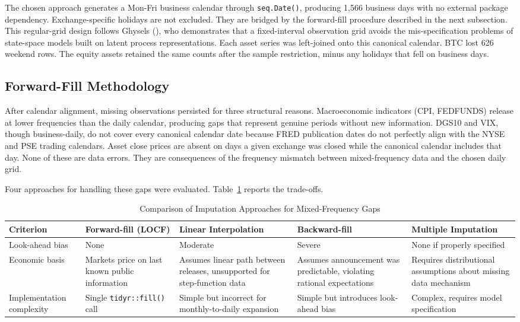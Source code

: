 The chosen approach generates a Mon-Fri business calendar through \texttt{seq.Date()}, producing 1,566 business days with no external package dependency. Exchange-specific holidays are not excluded. They are bridged by the forward-fill procedure described in the next subsection. This regular-grid design follows Ghysels (\cite{ghysels2016}), who demonstrates that a fixed-interval observation grid avoids the mis-specification problems of state-space models built on latent process representations. Each asset series was left-joined onto this canonical calendar. BTC lost 626 weekend rows. The equity assets retained the same counts after the sample restriction, minus any holidays that fell on business days.

\subsection{Forward-Fill Methodology}

After calendar alignment, missing observations persisted for three structural reasons. Macroeconomic indicators (CPI, FEDFUNDS) release at lower frequencies than the daily calendar, producing gaps that represent genuine periods without new information. DGS10 and VIX, though business-daily, do not cover every canonical calendar date because FRED publication dates do not perfectly align with the NYSE and PSE trading calendars. Asset close prices are absent on days a given exchange was closed while the canonical calendar includes that day. None of these are data errors. They are consequences of the frequency mismatch between mixed-frequency data and the chosen daily grid.

Four approaches for handling these gaps were evaluated. Table~\ref{tab:imputation_compare} reports the trade-offs.

\begin{table}[H]
  \centering
  \caption{Comparison of Imputation Approaches for Mixed-Frequency Gaps}
  \label{tab:imputation_compare}
  \begin{tabular}{l p{2.8cm} p{2.8cm} p{2.8cm} p{2.8cm}}
    \toprule
    Criterion & Forward-fill (LOCF) & Linear Interpolation & Backward-fill & Multiple Imputation \\
    \midrule
    Look-ahead bias & None & Moderate & Severe & None if properly specified \\
    Economic basis & Markets price on last known public information & Assumes linear path between releases, unsupported for step-function data & Assumes announcement was predictable, violating rational expectations & Requires distributional assumptions about missing data mechanism \\
    Implementation complexity & Single \texttt{tidyr::fill()} call & Simple but incorrect for monthly-to-daily expansion & Simple but introduces look-ahead bias & Complex, requires model specification \\
    \bottomrule
  \end{tabular}
\end{table}

